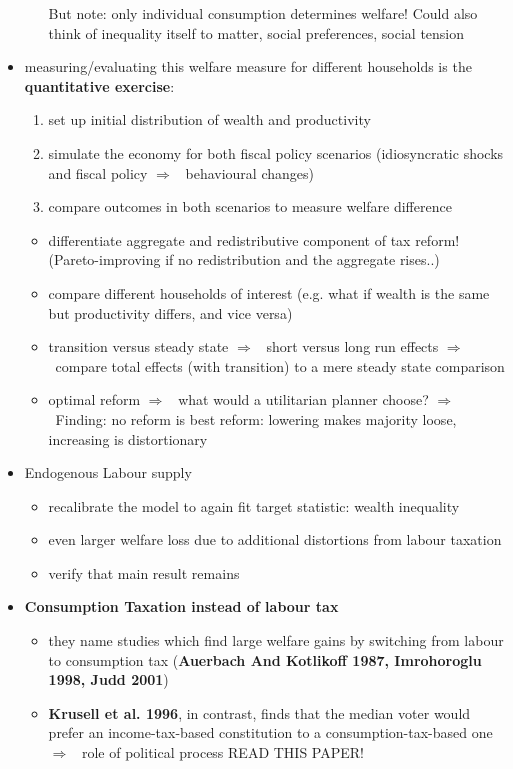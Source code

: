 \documentclass[12pt]{article}
\newcommand{\ar}{$\Rightarrow$ \ }
\begin{document}
\begin{itemize}
\begin{itemize}
\textcolor{sonja}{But note: only individual consumption determines welfare! Could also think of inequality itself to matter, social preferences, social tension}
\end{itemize}
\item measuring/evaluating this welfare measure for different households is the \textbf{quantitative exercise}:
\begin{enumerate}
\item set up initial distribution of wealth and productivity
\item simulate the economy for both fiscal policy scenarios (idiosyncratic shocks and fiscal policy \ar behavioural changes)
\item compare outcomes in both scenarios to measure welfare difference
\end{enumerate}
\begin{itemize}
\item differentiate aggregate and redistributive component of tax reform! (Pareto-improving if no redistribution and the aggregate rises..)
\item compare different households of interest (e.g. what if wealth is the same but productivity differs, and vice versa)
\item transition versus steady state \ar short versus long run effects \ar compare total effects (with transition) to a mere steady state comparison
\item optimal reform \ar what would a utilitarian planner choose? \ar Finding: no reform is best reform: lowering makes majority loose, increasing is distortionary
\end{itemize}
\item Endogenous Labour supply
\begin{itemize}
\item recalibrate the model to again fit target statistic: wealth inequality
\item even larger welfare loss due to additional distortions from labour taxation
\item verify that main result remains
\end{itemize}
\item \textbf{Consumption Taxation instead of labour tax}
\begin{itemize}
\item they name studies which find  large welfare gains by switching from labour to consumption tax (\textbf{Auerbach And Kotlikoff 1987, Imrohoroglu 1998, Judd 2001})
\item \textbf{Krusell et al. 1996}, in contrast,  finds that the median voter would prefer an income-tax-based constitution to a consumption-tax-based one \ar role of political process READ THIS PAPER!

\end{itemize}
\end{itemize}
\end{document}

